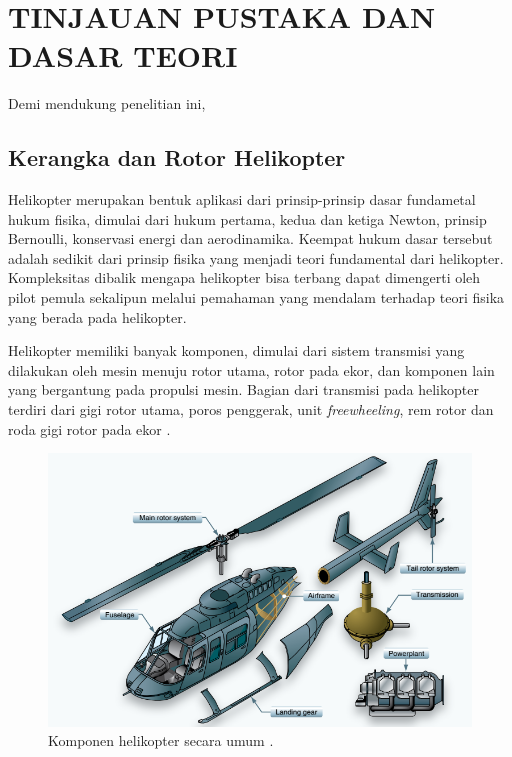 \chapter{TINJAUAN PUSTAKA DAN DASAR TEORI}
\label{chap:tinjauanpustaka}


Demi mendukung penelitian ini, \lipsum[1][1-5]

\section{Kerangka dan Rotor Helikopter}
\label{sec:strukturheli}

Helikopter merupakan bentuk aplikasi dari prinsip-prinsip dasar fundametal hukum fisika, dimulai dari hukum pertama, kedua dan ketiga Newton, prinsip Bernoulli, konservasi energi dan aerodinamika. Keempat hukum dasar tersebut adalah sedikit dari prinsip fisika yang menjadi teori fundamental dari helikopter. Kompleksitas dibalik mengapa helikopter bisa terbang dapat dimengerti oleh pilot pemula sekalipun melalui pemahaman yang mendalam terhadap teori fisika yang berada pada helikopter\cite{wagtendonk2006principles}.

Helikopter memiliki banyak komponen, dimulai dari sistem transmisi yang dilakukan oleh mesin menuju rotor utama, rotor pada ekor, dan komponen lain yang bergantung pada propulsi mesin. Bagian dari transmisi pada helikopter terdiri dari gigi rotor utama, poros penggerak, unit \textit{freewheeling}, rem rotor dan roda gigi rotor pada ekor  \cite{wagtendonk2006principles}.

\begin{figure}[H]
	\centering
	\includegraphics[width=0.8\linewidth]{gambar/komponenheli.png}
	\caption{Komponen helikopter secara umum \cite{handbook}.}
	\label{fig:komponenheli}
\end{figure}


